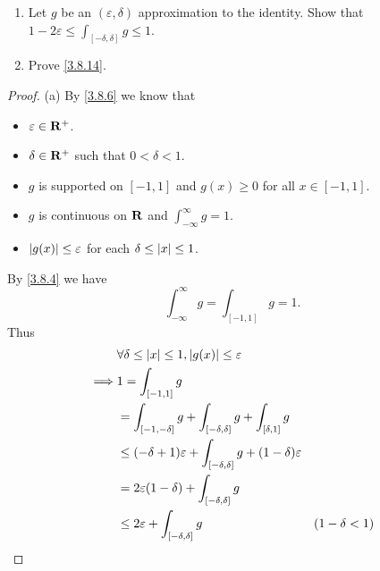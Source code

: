 \begin{exercise}\label{ex 3.8.6}
  \quad
  \begin{enumerate}
    \item Let \(g\) be an \((\varepsilon, \delta)\) approximation to the identity.
          Show that \(1 - 2 \varepsilon \leq \int_{[-\delta, \delta]} g \leq 1\).
    \item Prove \cref{3.8.14}.
  \end{enumerate}
\end{exercise}

\begin{proof}{(a)}
  By \cref{3.8.6} we know that
  \begin{itemize}
    \item \(\varepsilon \in \mathbf{R}^+\).
    \item \(\delta \in \mathbf{R}^+\) such that \(0 < \delta < 1\).
    \item \(g\) is supported on \([-1, 1]\) and \(g(x) \geq 0\) for all \(x \in [-1, 1]\).
    \item \(g\) is continuous on \(\mathbf{R}\) and \(\int_{-\infty}^\infty g = 1\).
    \item \(\left\lvert g(x)\right\rvert \leq \varepsilon\) for each \(\delta \leq \left\lvert x\right\rvert \leq 1\).
  \end{itemize}
  By \cref{3.8.4} we have
  \[
    \int_{-\infty}^\infty g = \int_{[-1, 1]} g = 1.
  \]
  Thus
  \begin{align*}
             & \forall \delta \leq \abs{x} \leq 1, \abs{g(x)} \leq \varepsilon                                                                                \\
    \implies & 1 = \int_{[-1, 1]} g                                                                                                                           \\
             & = \int_{[-1, -\delta]} g + \int_{[-\delta, \delta]} g + \int_{[\delta, 1]} g                                                                   \\
             & \leq (-\delta + 1) \varepsilon + \int_{[-\delta, \delta]} g + (1 - \delta) \varepsilon                                                         \\
             & = 2 \varepsilon (1 - \delta) + \int_{[-\delta, \delta]} g                                                                                      \\
             & \leq 2 \varepsilon + \int_{[-\delta, \delta]} g                                                 & (1 - \delta < 1)                             \\

\end{align*}
\end{proof}
